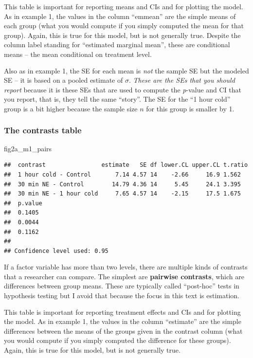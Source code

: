 \documentclass[]{book}
\newenvironment{Shaded}{\begin{snugshade}}{\end{snugshade}}
\newcommand{\NormalTok}[1]{#1}
\begin{document}
This table is important for reporting means and CIs and for plotting the model. As in example 1, the values in the column ``emmean'' are the simple means of each group (what you would compute if you simply computed the mean for that group). Again, this is true for this model, but is not generally true. Despite the column label standing for ``estimated marginal mean'', these are conditional means -- the mean conditional on treatment level.

Also as in example 1, the SE for each mean is \emph{not} the sample SE but the modeled SE -- it is based on a pooled estimate of \(\sigma\). \emph{These are the SEs that you should report} because it is these SEs that are used to compute the \emph{p}-value and CI that you report, that is, they tell the same ``story''. The SE for the ``1 hour cold'' group is a bit higher because the sample size \(n\) for this group is smaller by 1.

\hypertarget{the-contrasts-table}{%
\subsubsection{The contrasts table}\label{the-contrasts-table}}

\begin{Shaded}
\begin{Highlighting}[]
\NormalTok{fig2a_m1_pairs}
\end{Highlighting}
\end{Shaded}

\begin{verbatim}
##  contrast                estimate   SE df lower.CL upper.CL t.ratio
##  1 hour cold - Control       7.14 4.57 14    -2.66     16.9 1.562  
##  30 min NE - Control        14.79 4.36 14     5.45     24.1 3.395  
##  30 min NE - 1 hour cold     7.65 4.57 14    -2.15     17.5 1.675  
##  p.value
##  0.1405 
##  0.0044 
##  0.1162 
## 
## Confidence level used: 0.95
\end{verbatim}

If a factor variable has more than two levels, there are multiple kinds of contrasts that a researcher can compare. The simplest are \textbf{pairwise contrasts}, which are differences between group means. These are typically called ``post-hoc'' tests in hypothesis testing but I avoid that because the focus in this text is estimation.

This table is important for reporting treatment effects and CIs and for plotting the model. As in example 1, the values in the column ``estimate'' are the simple differences between the means of the groups given in the contrast column (what you would compute if you simply computed the difference for these groups). Again, this is true for this model, but is not generally true.
\end{document}
